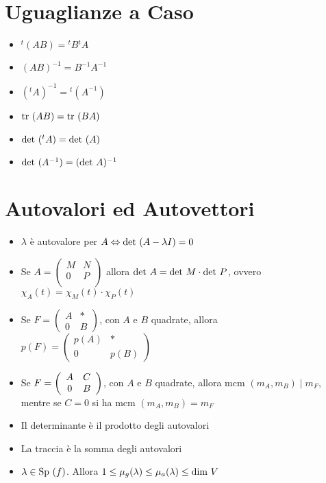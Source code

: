 \documentclass[a4paper,NoNotes,GeneralMath]{stdmdoc}
\begin{document}
	\section*{Uguaglianze a Caso}
	\begin{itemize}
		\item ${}^t(AB) = {}^tB {}^tA$
		\item $(AB)^{-1} = B^{-1}A^{-1}$
		\item $({}^tA)^{-1} = {}^t(A^{-1})$
		\item $\mbox{tr } (AB) = \mbox{tr } (BA)$
		\item $\mbox{det } ({}^tA) = \mbox{det } (A)$
		\item $\mbox{det } (A^{-1}) = (\mbox{det } A)^{-1}$
	\end{itemize}

	\section*{Autovalori ed Autovettori}
	\begin{itemize}
		\item $\lambda$ è autovalore per $A \Leftrightarrow \mbox{det }(A-\lambda I) = 0$
		\item Se $A = \left( \begin{array}{c|c} M & N \\ \hline 0 & P \\ \end{array} \right)$ allora $\mbox{det } A = \mbox{det } M \cdot \mbox{det } P$, ovvero $\chi_A(t) = \chi_M(t) \cdot \chi_P(t)$
		\item Se $F = \left( \begin{array}{cc} A & * \\ 0 & B \end{array} \right)$, con $A$ e $B$ quadrate, allora $p(F) = \left( \begin{array}{cc} p(A) & * \\ 0 & p(B) \end{array} \right)$
		\item Se $F = \left( \begin{array}{c c} A & C \\ 0 & B \end{array} \right)$, con $A$ e $B$ quadrate, allora $\text{mcm }(m_A, m_B) \mid m_F$, mentre se $C = 0$ si ha $\text{mcm }(m_A, m_B) = m_F$
		\item Il determinante è il prodotto degli autovalori
		\item La traccia è la somma degli autovalori
		\item $\lambda \in \mbox{Sp }(f)$. Allora $1 \le \mu_g(\lambda) \le \mu_a(\lambda) \le \mbox{dim } V$
	\end{itemize}
\end{document}

